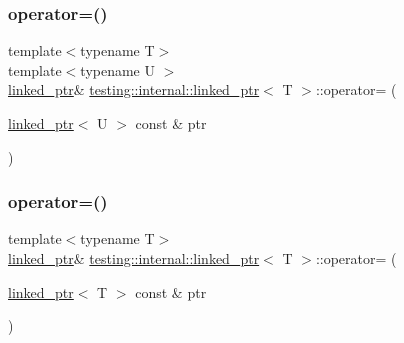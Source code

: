 \mbox{\label{classtesting_1_1internal_1_1linked__ptr_a82608d98869b750d9ab729f1450a9a45}} 
\subsubsection{\texorpdfstring{operator=()}{operator=()}\hspace{0.1cm}{\footnotesize\ttfamily [1/2]}}
{\footnotesize\ttfamily template$<$typename T$>$ \\
template$<$typename U $>$ \\
\hyperlink{classtesting_1_1internal_1_1linked__ptr}{linked\+\_\+ptr}\& \hyperlink{classtesting_1_1internal_1_1linked__ptr}{testing\+::internal\+::linked\+\_\+ptr}$<$ T $>$\+::operator= (\begin{DoxyParamCaption}\item[{\hyperlink{classtesting_1_1internal_1_1linked__ptr}{linked\+\_\+ptr}$<$ U $>$ const \&}]{ptr }\end{DoxyParamCaption})\hspace{0.3cm}{\ttfamily [inline]}}

\mbox{\label{classtesting_1_1internal_1_1linked__ptr_a1f40b5e66e6cf7b661ea116c806f952e}} 
\subsubsection{\texorpdfstring{operator=()}{operator=()}\hspace{0.1cm}{\footnotesize\ttfamily [2/2]}}
{\footnotesize\ttfamily template$<$typename T$>$ \\
\hyperlink{classtesting_1_1internal_1_1linked__ptr}{linked\+\_\+ptr}\& \hyperlink{classtesting_1_1internal_1_1linked__ptr}{testing\+::internal\+::linked\+\_\+ptr}$<$ T $>$\+::operator= (\begin{DoxyParamCaption}\item[{\hyperlink{classtesting_1_1internal_1_1linked__ptr}{linked\+\_\+ptr}$<$ T $>$ const \&}]{ptr }\end{DoxyParamCaption})\hspace{0.3cm}{\ttfamily [inline]}}

